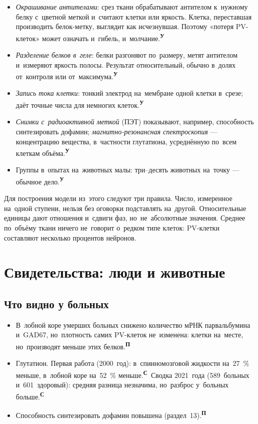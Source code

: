 \documentclass[11pt,a4paper,landscape,twocolumn]{article}
\newcommand{\tU}{\textsuperscript{\sffamily\bfseries\color{cM}У}}
\newcommand{\tS}{\textsuperscript{\sffamily\bfseries\color{cB}С}}
\newcommand{\tP}{\textsuperscript{\sffamily\bfseries\color{cA}П}}
\begin{document}
\begin{itemize}
\item \emph{Окрашивание антителами}: срез ткани обрабатывают антителом к~нужному белку с~цветной меткой и~считают клетки или яркость. Клетка, переставшая производить белок-метку, выглядит как исчезнувшая. Поэтому «потеря PV-клеток» может означать и~гибель, и~молчание.\tU
\item \emph{Разделение белков в~геле}: белки разгоняют по~размеру, метят антителом и~измеряют яркость полосы. Результат относительный, обычно в~долях от~контроля или от~максимума.\tU
\item \emph{Запись тока клетки}: тонкий электрод на~мембране одной клетки в~срезе; даёт точные числа для немногих клеток.\tU
\item \emph{Снимки с~радиоактивной меткой} (ПЭТ) показывают, например, способность синтезировать дофамин; \emph{магнитно-резонансная спектроскопия} — концентрацию вещества, в~частности глутатиона, усреднённую по~всем клеткам объёма.\tU
\item Группы в~опытах на~животных малы: три–десять животных на~точку — обычное дело.\tU
\end{itemize}
\begin{ineq}
Для построения модели из~этого следуют три правила. Число, измеренное на~одной ступени, нельзя без оговорки подставлять на~другой. Относительные единицы дают отношения и~сдвиги фаз, но~не~абсолютные значения. Среднее по~объёму ткани ничего не~говорит о~редком типе клеток: PV-клетки составляют несколько процентов нейронов.
\end{ineq}

\section{Свидетельства: люди и животные}
\subsection{Что видно у больных}
\begin{itemize}
\item В~лобной коре умерших больных снижено количество мРНК парвальбумина и~GAD67, но~плотность самих PV-клеток не~изменена: клетки на~месте, но~производят меньше этих белков.\tP
\item Глутатион. Первая работа (2000~год): в~спинномозговой жидкости на~27~\% меньше, в~лобной коре на~52~\% меньше.\tS\ Сводка 2021~года (589~больных и~601~здоровый): средняя разница незначима, но~разброс у~больных больше.\tS
\item Способность синтезировать дофамин повышена (раздел~13).\tP
\end{itemize}
\end{document}
